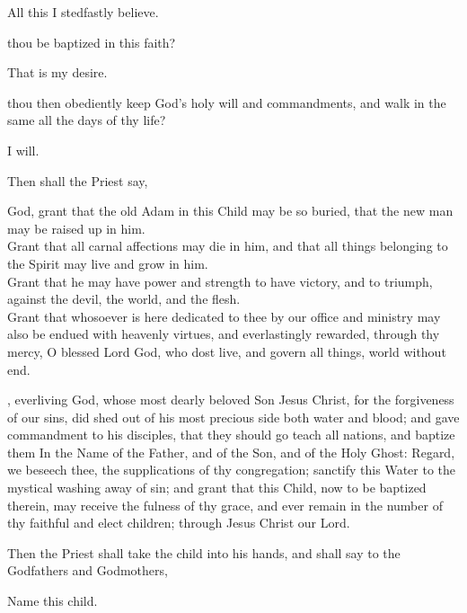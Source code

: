  All this I stedfastly believe.

 thou be baptized in this faith?

 That is my desire.

 thou then obediently keep God's holy will and commandments, and walk in the same all the days of thy life?

 I will.

\begin{rubric}
Then shall the Priest say,
\end{rubric}

 God, grant that the old Adam in this Child may be so buried, that the new man may be raised up in him. \\
Grant that all carnal affections may die in him, and that all things belonging to the Spirit may live and grow in him. \\
Grant that he may have power and strength to have victory, and to triumph, against the devil, the world, and the flesh. \\
Grant that whosoever is here dedicated to thee by our office and ministry may also be endued with heavenly virtues, and everlastingly rewarded, through thy mercy, O blessed Lord God, who dost live, and govern all things, world without end. 

, everliving God, whose most dearly beloved Son Jesus Christ, for the forgiveness of our sins, did shed out of his most precious side both water and blood; and gave commandment to his disciples, that they should go teach all nations, and baptize them In the Name of the Father, and of the Son, and of the Holy Ghost: Regard, we beseech thee, the supplications of thy congregation; sanctify this Water to the mystical washing away of sin; and grant that this Child, now to be baptized therein, may receive the fulness of thy grace, and ever remain in the number of thy faithful and elect children; through Jesus Christ our Lord.

\begin{rubric}
Then the Priest shall take the child into his hands, and shall say to the Godfathers and Godmothers,
\end{rubric}

\begin{center}
Name this child.
\end{center}

